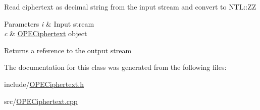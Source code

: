 Read {\ttfamily ciphertext} as decimal string from the input stream and convert to {\ttfamily N\+T\+L\+::\+ZZ} 
\begin{DoxyParams}{Parameters}
{\em i} & Input stream \\
\hline
{\em c} & {\ttfamily \hyperlink{classOPECiphertext}{O\+P\+E\+Ciphertext}} object \\
\hline
\end{DoxyParams}
\begin{DoxyReturn}{Returns}
a reference to the output stream 
\end{DoxyReturn}


The documentation for this class was generated from the following files\+:\begin{DoxyCompactItemize}
\item 
include/\hyperlink{OPECiphertext_8h}{O\+P\+E\+Ciphertext.\+h}\item 
src/\hyperlink{OPECiphertext_8cpp}{O\+P\+E\+Ciphertext.\+cpp}\end{DoxyCompactItemize}
